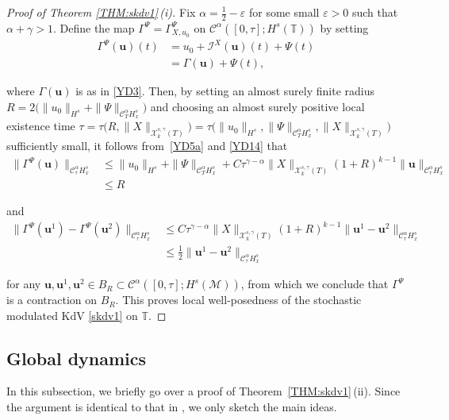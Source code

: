 \documentclass[letterpaper, 11pt,  reqno]{amsart}
\newcommand{\1}{\hspace{0.5mm}\text{I}\hspace{0.5mm}}
\newcommand{\I}{\mathcal{I}}
\newcommand{\noi}{\noindent}
\newcommand{\T}{\mathbb{T}}
\newcommand{\CC}{\mathcal{C}}
\newcommand{\al}{\alpha}
\newcommand{\eps}{\varepsilon}
\newcommand{\g}{\gamma}
\newcommand{\G}{\Gamma}
\newcommand{\M}{\mathcal{M}}
\newcommand{\cC}{\mathcal{C}}
\newcommand{\cX}{\mathcal{X}}
\newcommand{\uu}{\mathbf{u}}
\numberwithin{equation}{section}
\numberwithin{theorem}{section}
\begin{document}
\begin{proof}[Proof of Theorem \ref{THM:skdv1}\,(i)]
Fix $\al = \frac 12 - \eps$ for some small $\eps > 0$
such that $\al + \g > 1$.
Define the map 
$\G^\Psi  = \G^\Psi_{X, u_0}$ on $\cC^\al([0, \tau]; H^s(\T))$
by setting
\begin{align*}
\G^\Psi(\uu)(t) 
& = u_0 + \I^X(\uu)(t) + \Psi(t)\\
& = \G(\uu) + \Psi(t), 
\end{align*}

\noi
where $\G(\uu)$ is as in \eqref{YD3}.
Then, 
by setting 
an almost surely finite radius $R = 2 \big(\|u_0\|_{H^s}+ \|\Psi\|_{\CC^\al_T H^s_x}\big) $
and choosing 
an almost surely positive local existence time
$\tau = 
\tau\big(R, \|X\|_{\cX^{s, \g}_k(T)}\big) 
= 
\tau\big(\|u_0\|_{H^s}, 
\|\Psi\|_{\CC^\al_T H^s_x}, 
\|X\|_{\cX^{s, \g}_k(T)}\big)$
sufficiently small, 
it follows from~\eqref{YD5a} and \eqref{YD14} that 
\begin{align*}
 \|\G^\Psi(\uu)\|_{\CC^\al_\tau H^s_x}
&  \le \|u_0\|_{H^s} 
+ \|\Psi\|_{\CC^\al_T H^s_x} +  C \tau^{\g - \al}
\|X\|_{\cX^{s, \g}_k(T)}
(1+R) ^{k-1}
 \|\uu\|_{\CC^\al_{\tau } H^s_x} \\
& \le R
\end{align*}

\noi
and 
\begin{align*}
 \|\G^\Psi(\uu^1)- \G^\Psi(\uu^2)\|_{\cC^\al _{\tau} H^s_x}
&   \le
C
\tau^{\g - \al}\|X\|_{\cX^{s, \g}_k(T)} (1+ R)^{k-1}\|\uu^1- \uu^2 \|_{\CC^\al _\tau H^s_x}\\
& \le \frac 12 \|\uu^1- \uu^2 \|_{\CC^\al _\tau H^s_x}
\end{align*}

\noi
for any  $\uu, \uu^1, \uu^2
\in B_R\subset 
\cC^\al([0, \tau]; H^s(\M))$, 
from which
we conclude 
that $\G^\Psi$ is a contraction on $B_R$.
This proves 
 local well-posedness
of the stochastic modulated KdV \eqref{skdv1}
on $\T$.
\end{proof}





\subsection{Global dynamics}

In this subsection, we briefly 
go over a proof of Theorem~\ref{THM:skdv1}\,(ii).
Since the argument is identical to that in \cite{OQS}, 
we only
sketch the main ideas.
\end{document}
